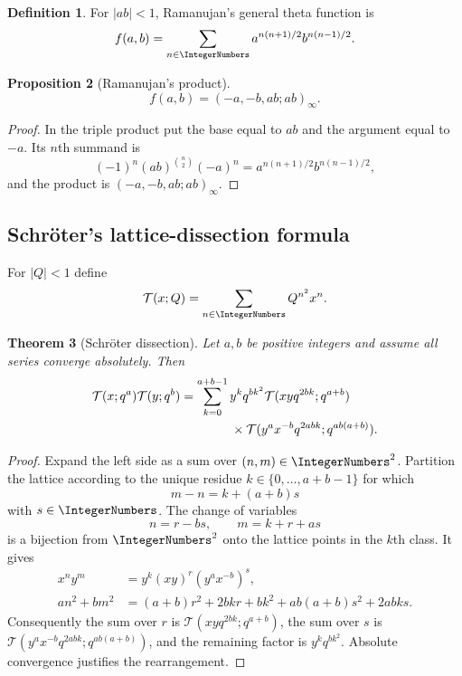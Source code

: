 \documentclass[11pt,oneside]{article}
\newtheorem{theorem}{Theorem}[section]
\newtheorem{proposition}[theorem]{Proposition}
\theoremstyle{definition}
\newtheorem{definition}[theorem]{Definition}
\newcommand{\T}{\mathcal T}
\begin{document}
\begin{definition}
For $|ab|<1$, Ramanujan's general theta function is
\begin{equation}\label{eq:ramanujan-f}
 f(a,b)=\sum_{n\in\IntegerNumbers}
 a^{n(n+1)/2}b^{n(n-1)/2}.
\end{equation}
\end{definition}

\begin{proposition}[Ramanujan's product]\label{prop:ramanujan-product}
\begin{equation}\label{eq:ramanujan-product}
 f(a,b)=(-a,-b,ab;ab)_\infty.
\end{equation}
\end{proposition}

\begin{proof}
In the triple product put the base equal to $ab$ and the argument equal
to $-a$. Its $n$th summand is
\[
 (-1)^n(ab)^{\binom n2}(-a)^n
 =a^{n(n+1)/2}b^{n(n-1)/2},
\]
and the product is $(-a,-b,ab;ab)_\infty$.
\end{proof}

\subsection{Schr\"oter's lattice-dissection formula}

For $|Q|<1$ define
\[
 \T(x;Q)=\sum_{n\in\IntegerNumbers}Q^{n^2}x^n.
\]

\begin{theorem}[Schr\"oter dissection]\label{thm:schroeter}
Let $a,b$ be positive integers and assume all series converge
absolutely. Then
\begin{align}
 \T(x;q^a)\T(y;q^b)
 &=\sum_{k=0}^{a+b-1}y^kq^{bk^2}
 \T(xyq^{2bk};q^{a+b})\notag\\
 &\qquad\qquad\times
 \T(y^ax^{-b}q^{2abk};q^{ab(a+b)}).
\label{eq:schroeter}
\end{align}
\end{theorem}

\begin{proof}
Expand the left side as a sum over $(n,m)\in\IntegerNumbers^2$. Partition the lattice
according to the unique residue $k\in\{0,\ldots,a+b-1\}$ for which
\[
 m-n=k+(a+b)s
\]
with $s\in\IntegerNumbers$. The change of variables
\[
 n=r-bs,\qquad m=k+r+as
\]
is a bijection from $\IntegerNumbers^2$ onto the lattice points in the $k$th class.
It gives
\begin{align*}
 x^ny^m&=y^k(xy)^r(y^ax^{-b})^s,\\
 an^2+bm^2
 &=(a+b)r^2+2bkr+bk^2
   +ab(a+b)s^2+2abks.
\end{align*}
Consequently the sum over $r$ is
$\T(xyq^{2bk};q^{a+b})$, the sum over $s$ is
$\T(y^ax^{-b}q^{2abk};q^{ab(a+b)})$, and the remaining factor is
$y^kq^{bk^2}$. Absolute convergence justifies the rearrangement.
\end{proof}
\end{document}
